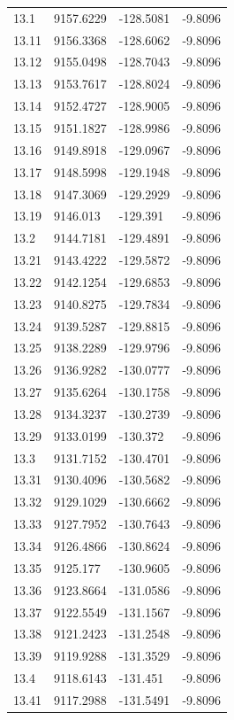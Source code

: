 \begin{table}[H]
\begin{tabular}{llll}
13.1 & 9157.6229 & -128.5081 & -9.8096 \\
13.11 & 9156.3368 & -128.6062 & -9.8096 \\
13.12 & 9155.0498 & -128.7043 & -9.8096 \\
13.13 & 9153.7617 & -128.8024 & -9.8096 \\
13.14 & 9152.4727 & -128.9005 & -9.8096 \\
13.15 & 9151.1827 & -128.9986 & -9.8096 \\
13.16 & 9149.8918 & -129.0967 & -9.8096 \\
13.17 & 9148.5998 & -129.1948 & -9.8096 \\
13.18 & 9147.3069 & -129.2929 & -9.8096 \\
13.19 & 9146.013 & -129.391 & -9.8096 \\
13.2 & 9144.7181 & -129.4891 & -9.8096 \\
13.21 & 9143.4222 & -129.5872 & -9.8096 \\
13.22 & 9142.1254 & -129.6853 & -9.8096 \\
13.23 & 9140.8275 & -129.7834 & -9.8096 \\
13.24 & 9139.5287 & -129.8815 & -9.8096 \\
13.25 & 9138.2289 & -129.9796 & -9.8096 \\
13.26 & 9136.9282 & -130.0777 & -9.8096 \\
13.27 & 9135.6264 & -130.1758 & -9.8096 \\
13.28 & 9134.3237 & -130.2739 & -9.8096 \\
13.29 & 9133.0199 & -130.372 & -9.8096 \\
13.3 & 9131.7152 & -130.4701 & -9.8096 \\
13.31 & 9130.4096 & -130.5682 & -9.8096 \\
13.32 & 9129.1029 & -130.6662 & -9.8096 \\
13.33 & 9127.7952 & -130.7643 & -9.8096 \\
13.34 & 9126.4866 & -130.8624 & -9.8096 \\
13.35 & 9125.177 & -130.9605 & -9.8096 \\
13.36 & 9123.8664 & -131.0586 & -9.8096 \\
13.37 & 9122.5549 & -131.1567 & -9.8096 \\
13.38 & 9121.2423 & -131.2548 & -9.8096 \\
13.39 & 9119.9288 & -131.3529 & -9.8096 \\
13.4 & 9118.6143 & -131.451 & -9.8096 \\
13.41 & 9117.2988 & -131.5491 & -9.8096 \\

\end{tabular}
\end{table}
